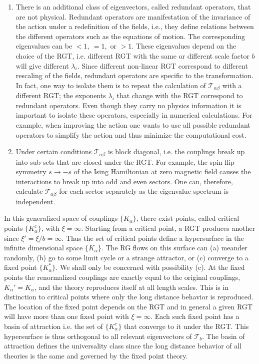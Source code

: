 \begin{enumerate}
\item There is an additional class of eigenvectors, called redundant
  operators, that are not physical.  Redundant operators are
  manifestation of the invariance of the action under a redefinition of
  the fields, i.e., they define relations between the different
  operators such as the equations of motion.  The corresponding
  eigenvalues can be $<1,\ =1,$ or $>1$.  These eigenvalues depend on
  the choice of the RGT, i.e. different RGT with the same or different
  scale factor $b$ will give different $\lambda_i$.  Since different
  non-linear RGT correspond to different rescaling of the fields,
  redundant operators are specific to the transformation.  In fact, one
  way to isolate them is to repeat the calculation of
  $\mathcal{T}_{\alpha\beta}$ with a different RGT; the exponents
  $\lambda_i$ that change with the RGT correspond to redundant
  operators.  Even though they carry no physics information it is
  important to isolate these operators, especially in numerical
  calculations.  For example, when improving the action one wants to use
  all possible redundant operators to simplify the action and thus
  minimize the computational cost.

\item Under certain conditions $\mathcal{T}_{\alpha\beta}$ is block
  diagonal, i.e. the couplings break up into sub-sets that are closed
  under the RGT.  For example, the spin flip symmetry $s \to -s$ of the
  Ising Hamiltonian at zero magnetic field causes the interactions to
  break up into odd and even sectors.  One can, therefore, calculate
  $\mathcal{T}_{\alpha\beta}$ for each sector separately as the
  eigenvalue spectrum is independent.
\end{enumerate}

In this generalized space of couplings $\{K_\alpha\}$, there exist
points, called critical points $\{K_\alpha^c\}$, with $\xi = \infty$.
Starting from a critical point, a RGT produces another since $\xi' =
\xi/b = \infty$.  Thus the set of critical points define a hypersurface
in the infinite dimensional space $\{K_\alpha\}$.  The RG flows on this
surface can (a) meander randomly, (b) go to some limit cycle or a
strange attractor, or (c) converge to a fixed point $\{K_\alpha^*\}$.
We shall only be concerned with possibility (c).  At the fixed points
the renormalized couplings are exactly equal to the original couplings,
$K_\alpha' = K_\alpha$, and the theory reproduces itself at all length
scales.  This is in distinction to critical points where only the long
distance behavior is reproduced.  The location of the fixed point
depends on the RGT and in general a given RGT will have more than one
fixed point with $\xi = \infty$.  Each such fixed point has a basin of
attraction i.e. the set of $\{K_\alpha^c\}$ that converge to it under
the RGT.  This hypersurface is thus orthogonal to all relevant
eigenvectors of $\mathcal{T}_b$.  The basin of attraction defines the
universality class since the long distance behavior of all theories is
the same and governed by the fixed point theory.

